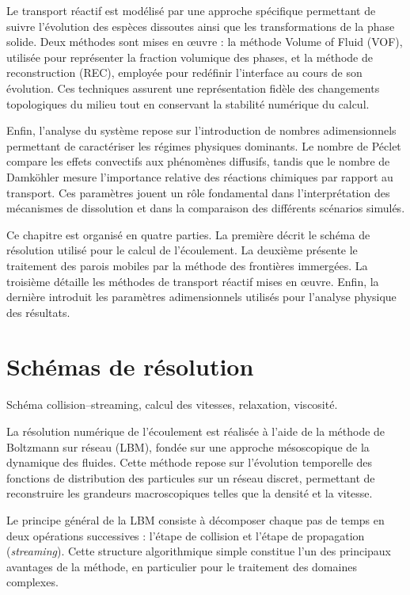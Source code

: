 \documentclass[12pt,a4paper]{report}
\begin{document}
Le transport réactif est modélisé par une approche spécifique permettant de suivre l’évolution des espèces dissoutes ainsi que les transformations de la phase solide. Deux méthodes sont mises en œuvre : la méthode Volume of Fluid (VOF), utilisée pour représenter la fraction volumique des phases, et la méthode de reconstruction (REC), employée pour redéfinir l’interface au cours de son évolution. Ces techniques assurent une représentation fidèle des changements topologiques du milieu tout en conservant la stabilité numérique du calcul.

Enfin, l’analyse du système repose sur l’introduction de nombres adimensionnels permettant de caractériser les régimes physiques dominants. Le nombre de Péclet compare les effets convectifs aux phénomènes diffusifs, tandis que le nombre de Damköhler mesure l’importance relative des réactions chimiques par rapport au transport. Ces paramètres jouent un rôle fondamental dans l’interprétation des mécanismes de dissolution et dans la comparaison des différents scénarios simulés.

Ce chapitre est organisé en quatre parties. La première décrit le schéma de résolution utilisé pour le calcul de l’écoulement. La deuxième présente le traitement des parois mobiles par la méthode des frontières immergées. La troisième détaille les méthodes de transport réactif mises en œuvre. Enfin, la dernière introduit les paramètres adimensionnels utilisés pour l’analyse physique des résultats.

\section{Schémas de résolution}
Schéma collision–streaming, calcul des vitesses, relaxation, viscosité.

La résolution numérique de l’écoulement est réalisée à l’aide de la méthode de Boltzmann sur réseau (LBM), fondée sur une approche mésoscopique de la dynamique des fluides. Cette méthode repose sur l’évolution temporelle des fonctions de distribution des particules sur un réseau discret, permettant de reconstruire les grandeurs macroscopiques telles que la densité et la vitesse.

Le principe général de la LBM consiste à décomposer chaque pas de temps en deux opérations successives : l’étape de collision et l’étape de propagation (\textit{streaming}). Cette structure algorithmique simple constitue l’un des principaux avantages de la méthode, en particulier pour le traitement des domaines complexes.
\end{document}
